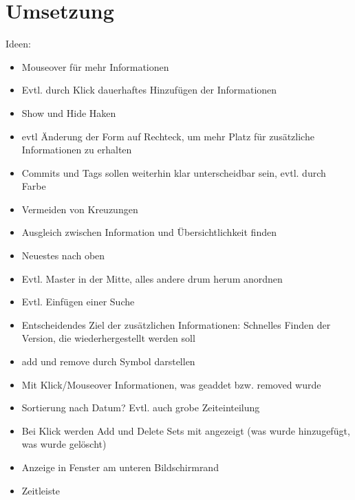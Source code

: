 \documentclass[color]{tudbook}
\begin{document}
\chapter{Umsetzung}
Ideen:
\begin{itemize}
\item Mouseover für mehr Informationen
\item Evtl. durch Klick dauerhaftes Hinzufügen der Informationen
\item Show und Hide Haken
\item evtl Änderung der Form auf Rechteck, um mehr Platz für zusätzliche Informationen zu erhalten
\item Commits und Tags sollen weiterhin klar unterscheidbar sein, evtl. durch Farbe
\item Vermeiden von Kreuzungen
\item Ausgleich zwischen Information und Übersichtlichkeit finden
\item Neuestes nach oben
\item Evtl. Master in der Mitte, alles andere drum herum anordnen
\item Evtl. Einfügen einer Suche
\item Entscheidendes Ziel der zusätzlichen Informationen: Schnelles Finden der Version, die wiederhergestellt werden soll
\item add und remove durch Symbol darstellen
\item Mit Klick/Mouseover Informationen, was geaddet bzw. removed wurde
\item Sortierung nach Datum? Evtl. auch grobe Zeiteinteilung
\item Bei Klick werden Add und Delete Sets mit angezeigt (was wurde hinzugefügt, was wurde gelöscht)
\item Anzeige in Fenster am unteren Bildschirmrand
\item Zeitleiste
\end{itemize}



\listoffigures
\end{document}
